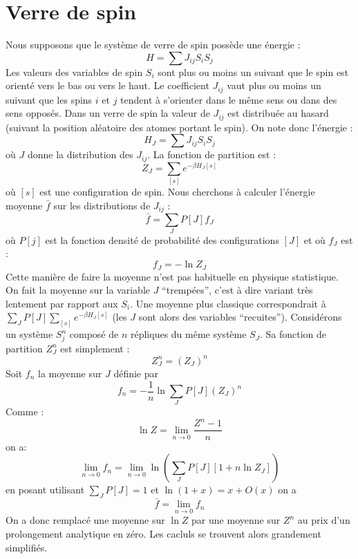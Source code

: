 \documentclass[12pt]{book}
\begin{document}
\section{Verre de spin}\label{secverredespi}
Nous supposons que le syst\`eme de verre de spin
poss\`ede une 
\'energie :
\begin{equation}
H=\sum J_{ij}S_iS_j
\end{equation}
Les valeurs des variables de spin $S_i$ sont plus ou moins un suivant
que le spin est orient\'e vers le bas ou vers le haut.
Le coefficient $J_{ij}$ vaut plus ou moins un suivant que les spins
$i$ et $j$ tendent \`a s'orienter dans le m\^eme sens ou dans des sens
oppos\'es. 
Dans un verre de spin la valeur de $J_{ij}$ est distribu\'ee au hasard
(suivant la position al\'eatoire des atomes portant le spin).
On note donc l'\'energie :
\begin{equation}
H_J=\sum J_{ij}S_iS_j
\end{equation}
o\`u $J$ donne la distribution des $J_{ij}$. La fonction de partition
est :
\begin{equation}
Z_J=\sum_{[s]}e^{-\beta H_J[s]}
\end{equation}
o\`u $[s]$ est une configuration  de spin. Nous cherchons \`a calculer
l'\'energie moyenne $\bar f$ sur les distributions de $J_{ij}$ :
\begin{equation}
\bar f=\sum_JP[J]f_J
\end{equation}
o\`u $P[j]$ est la fonction densit\'e de probabilit\'e des
configurations $[J]$ et o\`u $f_J$ est :
\begin{equation}
f_J=-\ln Z_J
\end{equation}
Cette mani\`ere de faire la moyenne n'est pas habituelle en physique
statistique. On fait la moyenne sur la variable $J$ ``tremp\'ees'',
c'est \`a dire variant tr\`es lentement par rapport aux $S_i$. Une
moyenne plus classique correspondrait \`a $\sum_J
P[J]\sum_{[s]}e^{-\beta H_J[s]}$ (les $J$ sont alors des variables
``recuites'').
Consid\'erons un syst\`eme $S_j^n$ compos\'e de $n$
r\'epliques du
m\^eme syst\`eme $S_J$. Sa fonction de partition $Z_J^n$ est simplement :
\begin{equation}
Z_J^n=(Z_J)^n
\end{equation}
Soit $f_n$ la moyenne sur $J$ d\'efinie par
\begin{equation}
f_n=-\frac{1}{n}\ln \sum_J P[J](Z_J)^n
\end{equation}
Comme :
\begin{equation}
\ln Z=\lim_{n\rightarrow 0}\frac{Z^n-1}{n}
\end{equation}
on a:
\begin{equation}
\lim_{n\rightarrow 0}f_n=\lim_{n\rightarrow 0}\ln (\sum_J P[J][1+n \ln Z_J])
\end{equation}
en posant utilisant $\sum_JP[J]=1$ et $\ln(1+x)=x+O(x)$ on a 
\begin{equation}
\bar f=\lim_{n\rightarrow 0}f_n
\end{equation}
On a donc remplac\'e une moyenne sur $\ln Z$ par une moyenne sur $Z^n$
au prix d'un prolongement analytique en z\'ero. Les cacluls se trouvent
alors grandement simplifi\'es\cite{ph:sping:Mezard87}.
\end{document}
